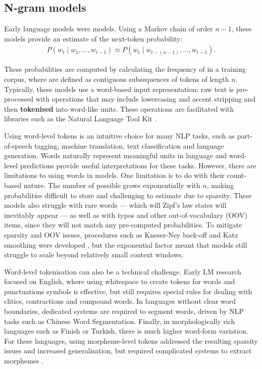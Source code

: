 \subsection{N-gram models}\label{sec:12-ngrams}

Early language models were \ngram models. Using a Markov chain of order $n-1$, these models provide an estimate of the next-token probability:
\begin{align}
    P\left(w_t \mid w_1, \dots, w_{t-1} \right) \approx P\left(w_t \mid w_{t-(n-1)}, \dots, w_{t-1}\right).\label{eq:ngram}
\end{align}

These probabilities are computed by calculating the frequency of \ngrams in a training corpus, where \ngrams are defined as contiguous subsequences of tokens of length $n$. Typically, these models use a word-based input representation: raw text is pre-processed with operations that may include lowercasing and accent stripping and then \textbf{tokenised} into word-like units. These operations are facilitated with libraries such as the Natural Language Tool Kit \citep[NLTK;][]{bird2009nltk}. 

Using word-level tokens is an intuitive choice for many NLP tasks, such as part-of-speech tagging, machine translation, text classification and language generation. Words naturally represent meaningful units in language and word-level predictions provide useful interpretations for these tasks. However, there are limitations to using words in \ngram models. One limitation is to do with their count-based nature. The number of possible \ngrams grows exponentially with $n$, making probabilities difficult to store and challenging to estimate due to sparsity. These models also struggle with rare words --- which will Zipf's law states will inevitably appear \citep{zipf_human_1949} --- as well as with typos and other out-of-vocabulary (OOV) items, since they will not match any pre-computed \ngram probabilities. To mitigate sparsity and OOV issues, procedures such as Kneser-Ney back-off and Katz smoothing were developed \citep{ney1994structuring, katz2003estimation}, but the exponential factor meant that \ngram models still struggle to scale beyond relatively small context windows.

Word-level tokenisation can also be a technical challenge. Early LM research focused on English, where using whitespace to create tokens for words and punctuations symbols is effective, but still requires special rules for dealing with clitics, contractions and compound words. In languages without clear word boundaries, dedicated systems are required to segment words, driven by NLP tasks such as Chinese Word Segmentation. Finally, in morphologically rich languages such as Finish or Turkish, there is much higher word-form variation. For these languages, using morpheme-level tokens addressed the resulting sparsity issues and increased generalisation, but required complicated systems to extract morphemes \citep{creutz2005unsupervised,habash2009}. %

